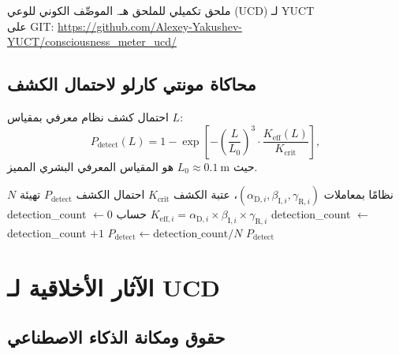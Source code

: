 \documentclass[12pt,a4paper]{article}
\newcommand{\eff}{\mathrm{eff}}
\newcommand{\Ke}{K_{\eff}}
\newcommand{\Kcrit}{K_{\mathrm{crit}}}
\begin{document}
	ملحق تكميلي للملحق هـ. الموصِّف الكوني للوعي (UCD) لـ YUCT \\ على GIT: \url{https://github.com/Alexey-Yakushev-YUCT/consciousness_meter_ucd/}
	
	\subsection{محاكاة مونتي كارلو لاحتمال الكشف}
	
	احتمال كشف نظام معرفي بمقياس \(L\):
	\[
	P_{\mathrm{detect}}(L) = 1 - \exp\!\left[-\left(\frac{L}{L_0}\right)^3 \cdot \frac{\Ke(L)}{\Kcrit}\right],
	\]
	حيث \(L_0 \approx 0.1~\mathrm{m}\) هو المقياس المعرفي البشري المميز.
	
	\begin{algorithm}
		\caption{محاكاة مونتي كارلو لكشف النظام المعرفي}
		\begin{algorithmic}[1]
			\REQUIRE \(N\) نظامًا بمعاملات \((\alpha_{\mathrm{D},i}, \beta_{\mathrm{I},i}, \gamma_{\mathrm{R},i})\)، عتبة الكشف \(\Kcrit\)
			\ENSURE احتمال الكشف \(P_{\mathrm{detect}}\)
			\STATE تهيئة detection\_count \(\gets 0\)
			\STATE حساب \(K_{\eff,i} = \alpha_{\mathrm{D},i} \times \beta_{\mathrm{I},i} \times \gamma_{\mathrm{R},i}\)
			\IF{\(K_{\eff,i} > \Kcrit\)}
			\STATE detection\_count \(\gets\) detection\_count \(+ 1\)
			\ENDIF
			\ENDFOR
			\STATE \(P_{\mathrm{detect}} \gets \text{detection\_count} / N\)
			\RETURN \(P_{\mathrm{detect}}\)
		\end{algorithmic}
	\end{algorithm}
	
	\section{الآثار الأخلاقية لـ UCD}
	
	\subsection{حقوق ومكانة الذكاء الاصطناعي}
	
\end{document}
